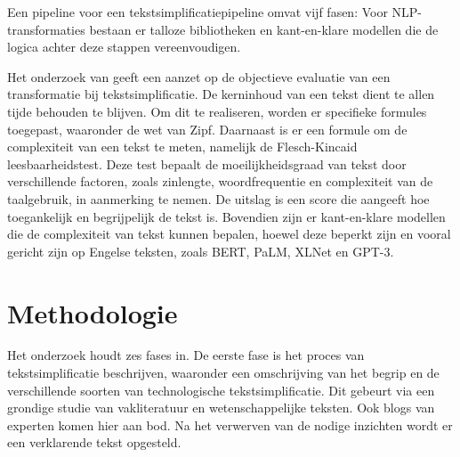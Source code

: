 Een pipeline voor een tekstsimplificatiepipeline omvat vijf fasen: Voor NLP-transformaties bestaan er talloze bibliotheken en kant-en-klare modellen die de logica achter deze stappen vereenvoudigen.

Het onderzoek van \textcite{VasquezRodriguez2021} geeft een aanzet op de objectieve evaluatie van een transformatie bij tekstsimplificatie. De kerninhoud van een tekst dient te allen tijde behouden te blijven. Om dit te realiseren, worden er specifieke formules toegepast, waaronder de wet van Zipf. Daarnaast is er een formule om de complexiteit van een tekst te meten, namelijk de Flesch-Kincaid leesbaarheidstest. Deze test bepaalt de moeilijkheidsgraad van tekst door verschillende factoren, zoals zinlengte, woordfrequentie en complexiteit van de taalgebruik, in aanmerking te nemen. De uitslag is een score die aangeeft hoe toegankelijk en begrijpelijk de tekst is. Bovendien zijn er kant-en-klare modellen die de complexiteit van tekst kunnen bepalen, hoewel deze beperkt zijn en vooral gericht zijn op Engelse teksten, zoals BERT, PaLM, XLNet en GPT-3.







\section{Methodologie}%
\label{sec:methodologie}


Het onderzoek houdt zes fases in. De eerste fase is het proces van tekstsimplificatie beschrijven, waaronder een omschrijving van het begrip en de verschillende soorten van technologische tekstsimplificatie. Dit gebeurt via een grondige studie van vakliteratuur en wetenschappelijke teksten. Ook blogs van experten komen hier aan bod. Na het verwerven van de nodige inzichten wordt er een verklarende tekst opgesteld.

